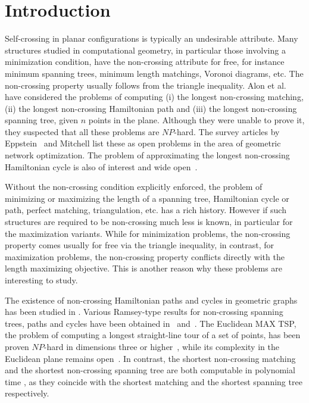 \documentclass[proceedings]{stacs}
\begin{document}
\maketitle

\section{Introduction} \label{sec:intro}

Self-crossing in planar configurations is typically an undesirable
attribute. Many structures studied in computational geometry, in particular
those involving a minimization condition, have the non-crossing
attribute for free, for instance minimum spanning trees, minimum
length matchings, Voronoi diagrams, etc.
The non-crossing property usually follows from the triangle inequality.
Alon et al.~\cite{ARS95} have considered the problems of computing
{\rm (i)} the longest non-crossing matching,
{\rm (ii)} the longest non-crossing Hamiltonian path and
{\rm (iii)} the longest non-crossing spanning tree,
given $n$ points in the plane. Although they were unable to prove it,
they suspected that all these problems are $NP$-hard.
The survey articles by Eppstein~\cite[pp. 439]{Ep00} and Mitchell
\cite[pp. 680]{Mi00} list these as open problems in the area of
geometric network optimization.
The problem of approximating the longest non-crossing
Hamiltonian cycle is also of interest and wide open~\cite[pp. 338]{BE97}.

Without the non-crossing condition explicitly enforced, the problem of
minimizing or maximizing the length of a spanning tree, Hamiltonian
cycle or path, perfect matching, triangulation, etc. has a rich history.
However if such structures are required to be non-crossing much less
is known, in particular for the maximization variants.
While for minimization problems, the non-crossing property comes
usually for free via the triangle inequality, in contrast, for
maximization problems, the non-crossing property conflicts directly
with the length maximizing objective. This is another reason why
these problems are interesting to study.

\medskip
{} The existence of non-crossing Hamiltonian
paths and cycles in geometric graphs has been studied in
\cite{ACF+08,CDJK07}.
Various Ramsey-type results for  non-crossing spanning trees, paths
and cycles have been obtained in~\cite{KPT97} and~\cite{KPTV98}.
The Euclidean MAX TSP, the problem of computing a longest
straight-line tour of a set of points, has been proven $NP$-hard in
dimensions three or higher~\cite{Fe99}, while its complexity in the
Euclidean plane remains open~\cite{Mi00}.
In contrast, the shortest non-crossing matching and the
shortest non-crossing spanning tree are both computable in polynomial time
\cite{Ep00,Mi00}, as they coincide with the shortest matching and the
shortest spanning tree respectively.
\end{document}
